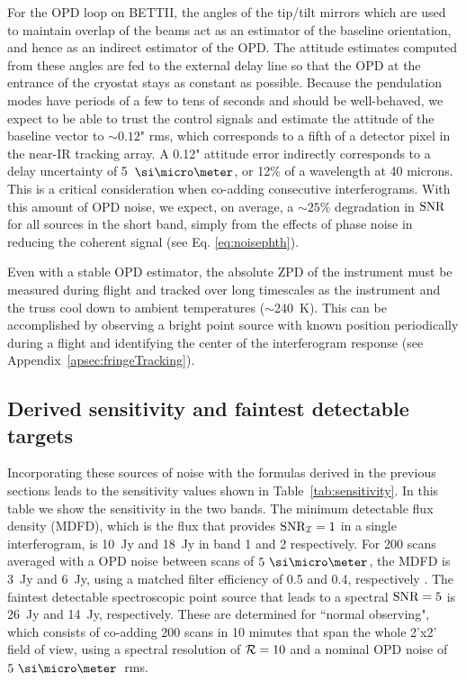 For the OPD loop on BETTII, the angles of the tip/tilt mirrors which are used to maintain overlap of the beams act as an estimator of the baseline orientation, and hence as an indirect estimator of the OPD. The attitude estimates computed from these angles are fed to the external delay line so that the OPD at the entrance of the cryostat stays as constant as possible. Because the pendulation modes have periods of a few to tens
of seconds and should be well-behaved, we expect to be able to trust the control signals and estimate the attitude of the baseline vector to $\sim 0.12$" rms, which corresponds to a fifth of a detector pixel in the near-IR tracking array. A 0.12" attitude error indirectly corresponds to a delay uncertainty of 5~$\um$, or 12\% of a wavelength at 40 microns. This is a critical consideration when co-adding consecutive interferograms. With this amount of OPD noise, we expect, on average, a $\sim 25\%$ degradation in $\textrm{SNR}$ for all sources in the short band, simply from the effects of phase noise in reducing the coherent signal (see Eq. \ref{eq:noisephth}).

Even with a stable OPD estimator, the absolute ZPD of the instrument must be measured during flight and tracked over long timescales as the instrument and the truss cool down to ambient temperatures ($\sim$240~K). This can be accomplished by observing a bright point source with known position periodically during a flight and identifying the center of the interferogram response (see Appendix~\ref{apsec:fringeTracking}).

\subsection{Derived sensitivity and faintest detectable targets}

Incorporating these sources of noise with the formulas derived in the previous sections leads to the sensitivity values shown in Table~\ref{tab:sensitivity}. In this table we show the sensitivity in the two bands. The minimum detectable flux density (MDFD), which is the flux that provides $\textrm{SNR}_{\mathcal{I}} = 1$ in a single interferogram, is 10~Jy and 18~Jy in band 1 and 2 respectively. For 200 scans averaged with a OPD noise between scans of $5~\um$, the MDFD is 3~Jy and 6~Jy, using a matched filter efficiency of 0.5 and 0.4, respectively \citep{Mighell:2005fwa}. The faintest detectable spectroscopic point source that leads to a spectral $\textrm{SNR}=5$ is 26~Jy and 14~Jy, respectively. These are determined for ``normal observing", which consists of co-adding 200 scans in 10 minutes that span the whole 2'x2' field of view, using a spectral resolution of $\mathcal{R}=10$ and a nominal OPD noise of $5~\um$~rms. 

